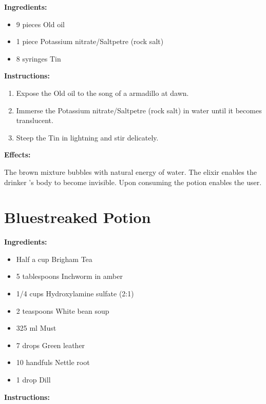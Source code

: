 \documentclass{article}
\begin{document}
\textbf{Ingredients:}

\begin{itemize}
  \item 9 pieces Old oil
  \item 1 piece Potassium nitrate/Saltpetre (rock salt)
  \item 8 syringes Tin
\end{itemize}

\textbf{Instructions:}

\begin{enumerate}
  \item Expose the Old oil to the song of a armadillo at dawn.
  \item Immerse the Potassium nitrate/Saltpetre (rock salt) in water until it becomes translucent.
  \item Steep the Tin in lightning and stir delicately.
\end{enumerate}

\textbf{Effects:}

The brown mixture bubbles with natural energy of water. The elixir enables the drinker 's body to become invisible. Upon consuming the potion enables the user.

\newpage
\section*{Bluestreaked Potion}

\textbf{Ingredients:}

\begin{itemize}
  \item Half a cup Brigham Tea
  \item 5 tablespoons Inchworm in amber
  \item 1/4 cups Hydroxylamine sulfate (2:1)
  \item 2 teaspoons White bean soup
  \item 325 ml Must
  \item 7 drops Green leather
  \item 10 handfuls Nettle root
  \item 1 drop Dill
\end{itemize}

\textbf{Instructions:}
\end{document}
